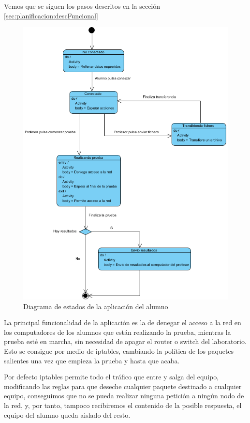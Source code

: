 Vemos que se siguen los pasos descritos en la sección \ref{sec:planificacion:descFuncional}


\begin{figure}
    \centering
    \includegraphics[width=12cm]{arquitectura/estadosAlumno}
    \caption{Diagrama de estados de la aplicación del alumno}
    \label{fig:arquitectura:estadosAlumno}
\end{figure}



La principal funcionalidad de la aplicación es la de denegar el acceso a la red en los computadores de los alumnos que están realizando la prueba, mientras la prueba esté en marcha, sin necesidad de apagar el router o switch del laboratorio. Esto se consigue por medio de iptables, cambiando la política de los paquetes salientes una vez que empieza la prueba y hasta que acaba.
\newline

Por defecto iptables permite todo el tráfico que entre y salga del equipo, modificando las reglas para que deseche cualquier paquete destinado a cualquier equipo, conseguimos que no se pueda realizar ninguna petición a ningún nodo de la red, y, por tanto, tampoco recibiremos el contenido de la posible respuesta, el equipo del alumno queda aislado del resto.
\newline

